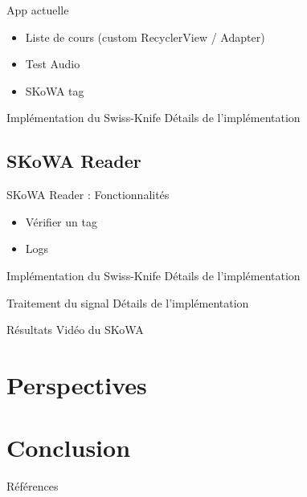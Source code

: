 \documentclass[aspectratio=169]{beamer}
\begin{document}
\begin{frame}{App actuelle}
  
  \begin{itemize}
    \item Liste de cours (custom RecyclerView / Adapter)
    \item Test Audio
    \item SKoWA tag
  \end{itemize}

\end{frame}

\begin{frame}{Implémentation du Swiss-Knife}
  Détails de l'implémentation
\end{frame}

\subsection{SKoWA Reader}

\begin{frame}{SKoWA Reader : Fonctionnalités}
  
  \begin{itemize}
    \item Vérifier un tag
    \item Logs
  \end{itemize}

\end{frame}

\begin{frame}{Implémentation du Swiss-Knife}
  Détails de l'implémentation
\end{frame}

\begin{frame}{Traitement du signal}
  Détails de l'implémentation
\end{frame}

\begin{frame}{Résultats}
  Vidéo du SKoWA
\end{frame}

\section{Perspectives}

\section{Conclusion}


\begin{frame}{Références}
  \printbibliography
\end{frame}
\end{document}
